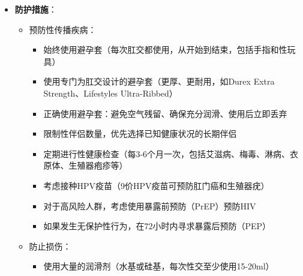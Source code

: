 \documentclass[12pt,UTF8]{ctexbook}
\begin{document}
\begin{itemize}
\begin{itemize}
\begin{itemize}
		\end{itemize}
		\item 长期健康影响：
		\begin{itemize}
			\item 肛门括约肌松弛：频繁或过度的肛交可能导致括约肌弹性下降
			\item 痔疮加重：肛交可能导致已有痔疮加重或新的痔疮形成
			\item 直肠脱垂：罕见但严重的并发症，直肠黏膜或全层从肛门脱出
			\item 直肠息肉或肿瘤风险：长期反复的炎症刺激可能增加直肠息肉或肿瘤的风险
		\end{itemize}
		\item 其他健康风险：
		\begin{itemize}
			\item 过敏反应：对避孕套、润滑剂、性玩具材料的过敏反应
			\item 肛门瘙痒或湿疹：反复刺激或感染可能导致肛门周围皮肤问题
			\item 心理创伤：非自愿或粗暴的肛交可能导致心理创伤和性焦虑
		\end{itemize}
	\end{itemize}
	\item \textbf{防护措施}：
	\begin{itemize}
		\item 预防性传播疾病：
		\begin{itemize}
			\item 始终使用避孕套（每次肛交都使用，从开始到结束，包括手指和性玩具）
			\item 使用专门为肛交设计的避孕套（更厚、更耐用，如Durex Extra Strength、Lifestyles Ultra-Ribbed）
			\item 正确使用避孕套：避免空气残留、确保充分润滑、使用后立即丢弃
			\item 限制性伴侣数量，优先选择已知健康状况的长期伴侣
			\item 定期进行性健康检查（每3-6个月一次，包括艾滋病、梅毒、淋病、衣原体、生殖器疱疹等）
			\item 考虑接种HPV疫苗（9价HPV疫苗可预防肛门癌和生殖器疣）
			\item 对于高风险人群，考虑使用暴露前预防（PrEP）预防HIV
			\item 如果发生无保护性行为，在72小时内寻求暴露后预防（PEP）
		\end{itemize}
		\item 防止损伤：
		\begin{itemize}
			\item 使用大量的润滑剂（水基或硅基，每次性交至少使用15-20ml）

\end{itemize}
\end{itemize}
\end{itemize}
\end{document}
